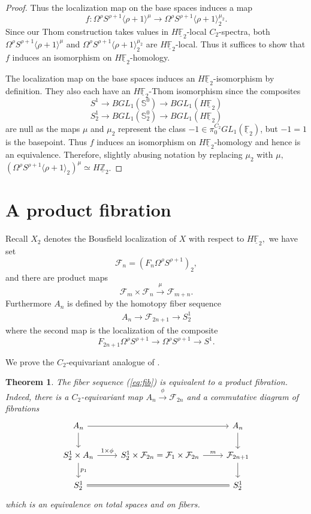\documentclass[]{amsart}  %
\newtheorem{theorem}{Theorem}[section]
\theoremstyle{definition}
\numberwithin{equation}{section}
\numberwithin{figure}{section}
\newcommand{\mF}{{\mathbb F}}
\newcommand{\mS}{{\mathbb S}}
\newcommand{\mZ}{{\mathbb Z}}
\newcommand{\cF}{{\mathcal F}}
\newcommand{\umF}{\underline{\mF}}
\newcommand{\umZ}{\underline{\mZ}}
\newcommand{\0}{\langle 0 \rangle}
\begin{document}
\begin{proof}
Thus the localization map on the base spaces induces a map
\[
f: \Omega^\rho S^{\rho + 1} \langle \rho + 1 \rangle^\mu \to \Omega^\rho S^{\rho + 1} \langle \rho + 1 \rangle_2^{\mu_2}. 
\]
Since our Thom construction takes values in $H \umF_2$-local $C_2$-spectra, both \\ $\Omega^\rho S^{\rho + 1} \langle \rho + 1 \rangle^\mu$ and $\Omega^\rho S^{\rho + 1} \langle \rho + 1 \rangle_2^{\mu_2}$ are $H \umF_2$-local. Thus it suffices to show that $f$ induces an isomorphism on $H \umF_2$-homology. 

The localization map on the base spaces induces an $H \umF_2$-isomorphism by definition. They also each have an $H \umF_2$-Thom isomorphism since the composites 
\[
S^1 \to BGL_1 (\mS^0) \to BGL_1 (H \umF_2) \]
\[
S^1_2 \to BGL_1 (\mS^0_2) \to BGL_1 (H \umF_2)
\]
are null as the maps $\mu$ and $\mu_2$ represent the class $-1 \in \pi_0^{C_2} GL_1 (\umF_2)$, but $-1 = 1$ is the basepoint. 
Thus $f$ induces an isomorphism on $H \umF_2$-homology and hence is an equivalence. Therefore, slightly abusing notation by replacing $\mu_2$ with $\mu,$ $(\Omega^\rho S^{\rho + 1} \langle \rho + 1 \rangle_2)^\mu \simeq H \umZ_2$.
\end{proof}
 
\section{A product fibration} \label{sec:fib} 
Recall $X_2$ denotes the Bousfield localization of $X$ with respect to $H {\umF_2},$ we have set
$$\cF_n = (F_n \Omega^\rho S^{\rho + 1})_2,$$
and there are product maps 
	$$ \cF_m \times \cF_n \overset{\mu}{\rightarrow} \cF_{m + n} .$$
 Furthermore $A_n$ is defined by the homotopy fiber sequence 
	\begin{align} 
		A_n \to \cF_{2n + 1} \to S^1_2
	\end{align}
	where the second map is the localization of the composite
	$$ F_{2n + 1} \Omega^\rho S^{\rho + 1} \to \Omega^\rho S^{\rho + 1} \to S^1. $$ 
	
	We prove the $C_2$-equivariant analogue of \cite[Theorem~1.3]{CDGM1988}.
	\begin{theorem} \label{thm:main}
		The fiber sequence (\ref{eq:fib}) is equivalent to a product fibration. Indeed, there is a $C_2$-equivariant map $A_n \overset{\phi}{\rightarrow} \cF_{2n}$ and a commutative diagram of fibrations
		\[
		\begin{tikzcd}
			A_n \arrow[rr] \arrow[d]{} & & A_n \arrow[d] \\
			S_2^1 \times A_n \arrow[r, "1 \times \phi"] \arrow[d, "p_1"] & S_2^1 \times \cF_{2n}= \cF_1 \times \cF_{2n} \arrow[r, "m"] & \cF_{2n + 1} \arrow[d] \\
			S_2^1 \arrow[rr, equal] & & S_2^1
		\end{tikzcd}
		\]
		which is an equivalence on total spaces and on fibers.
	\end{theorem}
 
\end{document}
